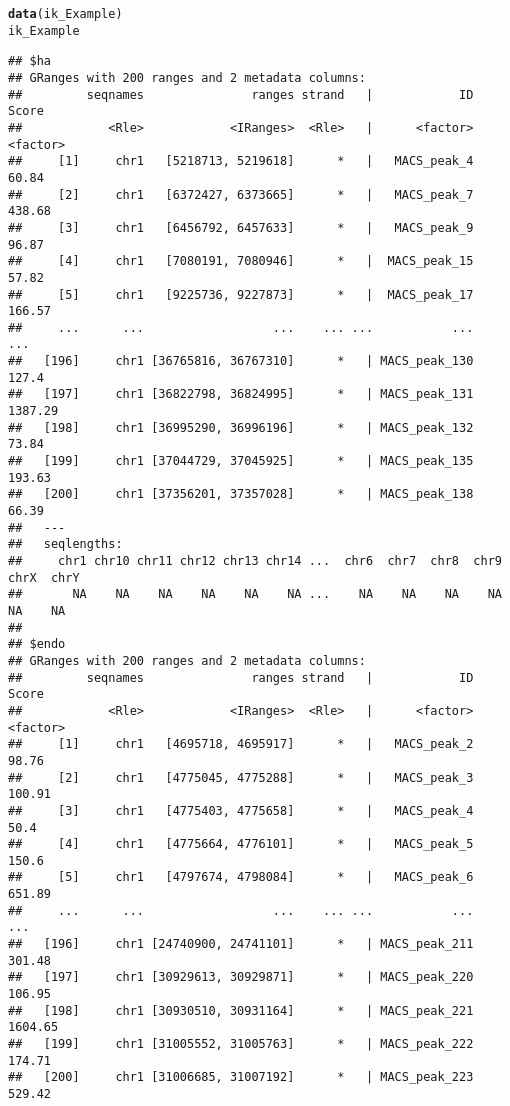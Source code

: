 \documentclass[12pt]{article}\usepackage[]{graphicx}\usepackage[usenames,dvipsnames]{color}
\makeatletter
\newcommand{\hlstd}[1]{\textcolor[rgb]{0.345,0.345,0.345}{#1}}%
\newcommand{\hlkwd}[1]{\textcolor[rgb]{0.737,0.353,0.396}{\textbf{#1}}}%
\newenvironment{kframe}{%
 \def\at@end@of@kframe{}%
 \ifinner\ifhmode%
  \def\at@end@of@kframe{\end{minipage}}%
  \begin{minipage}{\columnwidth}%
 \fi\fi%
 \def\FrameCommand##1{\hskip\@totalleftmargin \hskip-\fboxsep
 \colorbox{shadecolor}{##1}\hskip-\fboxsep
     \hskip-\linewidth \hskip-\@totalleftmargin \hskip\columnwidth}%
 \MakeFramed {\advance\hsize-\width
   \@totalleftmargin\z@ \linewidth\hsize
   \@setminipage}}%
 {\par\unskip\endMakeFramed%
 \at@end@of@kframe}
\newenvironment{knitrout}{}{} %
\makeatother
\begin{document}
\begin{knitrout}
\color{fgcolor}\begin{kframe}
\begin{alltt}
\hlkwd{data}\hlstd{(ik_Example)}
\hlstd{ik_Example}
\end{alltt}
\begin{verbatim}
## $ha
## GRanges with 200 ranges and 2 metadata columns:
##         seqnames               ranges strand   |            ID    Score
##            <Rle>            <IRanges>  <Rle>   |      <factor> <factor>
##     [1]     chr1   [5218713, 5219618]      *   |   MACS_peak_4    60.84
##     [2]     chr1   [6372427, 6373665]      *   |   MACS_peak_7   438.68
##     [3]     chr1   [6456792, 6457633]      *   |   MACS_peak_9    96.87
##     [4]     chr1   [7080191, 7080946]      *   |  MACS_peak_15    57.82
##     [5]     chr1   [9225736, 9227873]      *   |  MACS_peak_17   166.57
##     ...      ...                  ...    ... ...           ...      ...
##   [196]     chr1 [36765816, 36767310]      *   | MACS_peak_130    127.4
##   [197]     chr1 [36822798, 36824995]      *   | MACS_peak_131  1387.29
##   [198]     chr1 [36995290, 36996196]      *   | MACS_peak_132    73.84
##   [199]     chr1 [37044729, 37045925]      *   | MACS_peak_135   193.63
##   [200]     chr1 [37356201, 37357028]      *   | MACS_peak_138    66.39
##   ---
##   seqlengths:
##     chr1 chr10 chr11 chr12 chr13 chr14 ...  chr6  chr7  chr8  chr9  chrX  chrY
##       NA    NA    NA    NA    NA    NA ...    NA    NA    NA    NA    NA    NA
## 
## $endo
## GRanges with 200 ranges and 2 metadata columns:
##         seqnames               ranges strand   |            ID    Score
##            <Rle>            <IRanges>  <Rle>   |      <factor> <factor>
##     [1]     chr1   [4695718, 4695917]      *   |   MACS_peak_2    98.76
##     [2]     chr1   [4775045, 4775288]      *   |   MACS_peak_3   100.91
##     [3]     chr1   [4775403, 4775658]      *   |   MACS_peak_4     50.4
##     [4]     chr1   [4775664, 4776101]      *   |   MACS_peak_5    150.6
##     [5]     chr1   [4797674, 4798084]      *   |   MACS_peak_6   651.89
##     ...      ...                  ...    ... ...           ...      ...
##   [196]     chr1 [24740900, 24741101]      *   | MACS_peak_211   301.48
##   [197]     chr1 [30929613, 30929871]      *   | MACS_peak_220   106.95
##   [198]     chr1 [30930510, 30931164]      *   | MACS_peak_221  1604.65
##   [199]     chr1 [31005552, 31005763]      *   | MACS_peak_222   174.71
##   [200]     chr1 [31006685, 31007192]      *   | MACS_peak_223   529.42

\end{verbatim}
\end{kframe}
\end{knitrout}
\end{document}
